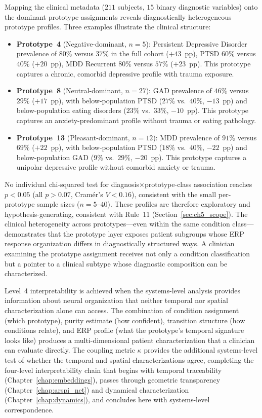 Mapping the clinical metadata ($211$ subjects, $15$ binary diagnostic variables) onto the dominant prototype assignments reveals diagnostically heterogeneous prototype profiles. Three examples illustrate the clinical structure:
\begin{itemize}
    \item \textbf{Prototype~4} (Negative-dominant, $n = 5$): Persistent Depressive Disorder prevalence of $80\%$ versus $37\%$ in the full cohort ($+43$~pp), PTSD $60\%$ versus $40\%$ ($+20$~pp), MDD Recurrent $80\%$ versus $57\%$ ($+23$~pp). This prototype captures a chronic, comorbid depressive profile with trauma exposure.
    \item \textbf{Prototype~8} (Neutral-dominant, $n = 27$): GAD prevalence of $46\%$ versus $29\%$ ($+17$~pp), with below-population PTSD ($27\%$ vs.\ $40\%$, $-13$~pp) and below-population eating disorders ($23\%$ vs.\ $33\%$, $-10$~pp). This prototype captures an anxiety-predominant profile without trauma or eating pathology.
    \item \textbf{Prototype~13} (Pleasant-dominant, $n = 12$): MDD prevalence of $91\%$ versus $69\%$ ($+22$~pp), with below-population PTSD ($18\%$ vs.\ $40\%$, $-22$~pp) and below-population GAD ($9\%$ vs.\ $29\%$, $-20$~pp). This prototype captures a unipolar depressive profile without comorbid anxiety or trauma.
\end{itemize}
No individual chi-squared test for diagnosis$\times$prototype-class association reaches $p < 0.05$ (all $p > 0.07$, Cram\'{e}r's $V < 0.16$), consistent with the small per-prototype sample sizes ($n = 5$--$40$). These profiles are therefore exploratory and hypothesis-generating, consistent with Rule~11 (Section~\ref{sec:ch5_scope}). The clinical heterogeneity across prototypes---even within the same condition class---demonstrates that the prototype layer exposes patient subgroups whose ERP response organization differs in diagnostically structured ways. A clinician examining the prototype assignment receives not only a condition classification but a pointer to a clinical subtype whose diagnostic composition can be characterized.

Level~4 interpretability is achieved when the systems-level analysis provides information about neural organization that neither temporal nor spatial characterization alone can access. The combination of condition assignment (which prototype), purity estimate (how confident), transition structure (how conditions relate), and ERP profile (what the prototype's temporal signature looks like) produces a multi-dimensional patient characterization that a clinician can evaluate directly. The coupling metric $\kappa$ provides the additional systems-level test of whether the temporal and spatial characterizations agree, completing the four-level interpretability chain that begins with temporal traceability (Chapter~\ref{chap:embeddings}), passes through geometric transparency (Chapter~\ref{chap:arspi_net}) and dynamical characterization (Chapter~\ref{chap:dynamics}), and concludes here with systems-level correspondence.

